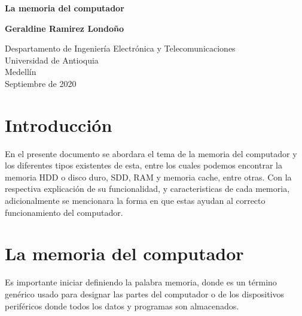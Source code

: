 \documentclass[12pt,oneside]{book}
\begin{document}
\begin{titlepage}
    \begin{center}
        \vspace*{1cm}
            
        \Huge
        \textbf{La memoria del computador}
            
        \vspace{0.5cm}
        \LARGE
        
            
        \vspace{1.5cm}
            
        \textbf{Geraldine Ramirez Londoño }
            
        \vfill
            
        \vspace{0.8cm}
            
        \Large
        Despartamento de Ingeniería Electrónica y Telecomunicaciones\\
        Universidad de Antioquia\\
        Medellín\\
        Septiembre de 2020
            
    \end{center}
\end{titlepage}
\newpage

\tableofcontents
\newpage
\section{Introducción}


En el presente documento se abordara el tema de la memoria del computador y los diferentes tipos existentes de esta, entre los cuales podemos encontrar la memoria HDD o disco duro, SDD, RAM y memoria cache, entre otras. Con la respectiva explicación de su funcionalidad, y caracteristicas de cada memoria, adicionalmente se mencionara la forma en que estas ayudan al correcto funcionamiento del computador. 

\section{La memoria del computador }
Es importante iniciar definiendo la palabra memoria, donde es un término genérico usado para designar las partes del computador o de los dispositivos periféricos donde todos los datos y programas son almacenados. \cite{memoria-computadora}
\end{document}
